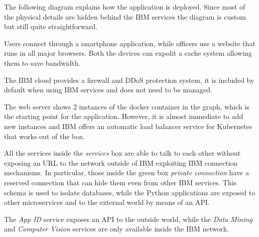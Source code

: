 The following diagram explains how the application is deployed. Since most of the physical details are hidden behind the IBM services the diagram is custom but still quite straightforward.

Users connect through a smartphone application, while officers use a website that runs in all major browsers. Both the devices can expolit a cache system allowing them to save bandwidth.

The IBM cloud provides a firewall and DDoS protection system, it is included by default when using IBM services and does not need to be managed.

The web server shows 2 instances of the docker container in the graph, which is the starting point for the application. However, it is almost immediate to add new instances and IBM offers an automatic load balancer service for Kubernetes that works out of the box.

All the services inside the \textit{services} box are able to talk to each other without exposing an URL to the network outside of IBM exploiting IBM connection mechanisms. In particular, those inside the green box \textit{private connection} have a reserved connection that can hide them even from other IBM services. This schema is used to isolate databases, while the Python applications are exposed to other microservices and to the external world by means of an API.

The \textit{App ID} service exposes an API to the outside world, while the \textit{Data Mining} and \textit{Computer Vision} services are only available inside the IBM network.

